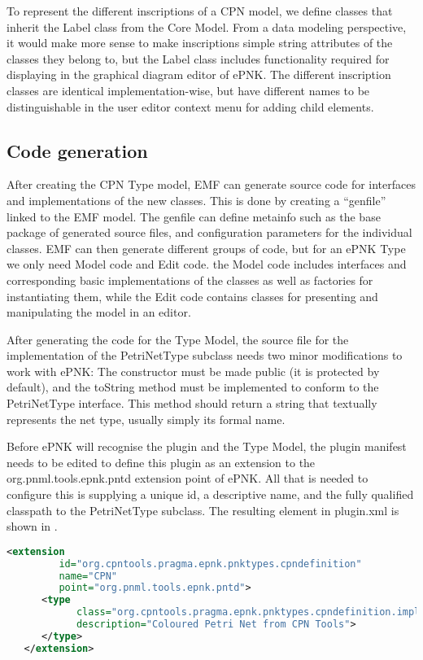 To represent the different inscriptions of a CPN model, we define classes that
inherit the Label class from the Core Model. From a data modeling
perspective, it would make more sense to make inscriptions simple
string attributes of the classes they belong to, but the Label class includes
functionality required for displaying in the graphical diagram editor of ePNK.
The different inscription classes are identical implementation-wise, but have
different names to be distinguishable in the user editor context menu for adding
child elements.

\subsection{Code generation}
After creating the CPN Type model, EMF can generate source code for interfaces
and implementations of the new classes. This is done by creating a ``genfile''
linked to the EMF model. The genfile can define metainfo such as the base
package of generated source files, and configuration parameters for the
individual classes. EMF can then generate different groups of code, but for an
ePNK Type we only need Model code and Edit code. the Model code includes
interfaces and corresponding basic implementations of the classes as well as
factories for instantiating them, while the Edit code contains classes for
presenting and manipulating the model in an editor.

After generating the code for the Type Model, the source file for
the implementation of the PetriNetType subclass needs two minor modifications
to work with ePNK: The constructor must be made public (it is protected by
default), and the toString method must be implemented to conform to the
PetriNetType interface. This method should return a string that textually
represents the net type, usually simply its formal name.

Before ePNK will recognise the plugin and the Type Model, the plugin manifest
needs to be edited to define this plugin as an extension to the
org.pnml.tools.epnk.pntd extension point of ePNK. All that is needed to
configure this is supplying a unique id, a descriptive name, and the fully
qualified classpath to the PetriNetType subclass. The resulting
element in plugin.xml is shown in . 

\begin{lstlisting}[language=XML,label=lst:pntd_xml,float,
caption=ePNK Petri Net Type Definition Extension]
   <extension
         id="org.cpntools.pragma.epnk.pnktypes.cpndefinition"
         name="CPN"
         point="org.pnml.tools.epnk.pntd">
      <type
            class="org.cpntools.pragma.epnk.pnktypes.cpndefinition.impl.CPNImpl"
            description="Coloured Petri Net from CPN Tools">
      </type>
   </extension> 
\end{lstlisting}

